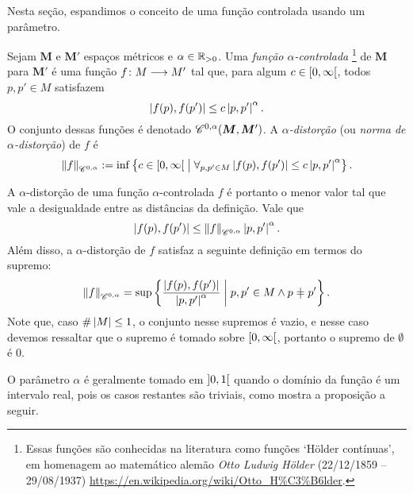 Nesta seção, espandimos o conceito de uma função controlada usando um parâmetro.

\begin{definition}
Sejam $\bm M$ e $\bm M'$ espaços métricos e $\alpha \in \mathbb{R}_{>0}$. Uma \emph{função $\alpha$-controlada}%
	\footnote{Essas funções são conhecidas na literatura como funções `Hölder contínuas', em homenagem ao matemático alemão \emph{Otto Ludwig Hölder} (22/12/1859 – 29/08/1937) \url{https://en.wikipedia.org/wiki/Otto_H\%C3\%B6lder}.} %
de $\bm M$ para $\bm M'$ é uma função ${f}\colon {M} \longrightarrow {M'}$ tal que, para algum $c \in \left[{0},{\infty}\right[$, todos $p,p' \in M$ satisfazem
	\begin{equation*}
	\left\vert{f(p)},{f(p')}\right\vert \leq c\left\vert{p},{p'}\right\vert^\alpha.
	\end{equation*}
O conjunto dessas funções é denotado $\mathscr{C}^{0,\alpha}(\bm M, \bm M')$. A \emph{$\alpha$-distorção} (ou \emph{norma de $\alpha$-distorção}) de $f$ é
	\begin{equation*}
	\left\Vert{f}\right\Vert_{\mathscr{C}^{0,\alpha}} := \inf\left\{{c \in \left[{0},{\infty}\right[}\;\middle\vert\;{\forall_{p,p' \in M} \left\vert{f(p)},{f(p')}\right\vert \leq c\left\vert{p},{p'}\right\vert^\alpha}\right\}.
	\end{equation*}
\end{definition}

A $\alpha$-distorção de uma função $\alpha$-controlada $f$ é portanto o menor valor tal que vale a desigualdade entre as distâncias da definição. Vale que
	\begin{equation*}
	\left\vert{f(p)},{f(p')}\right\vert \leq \left\Vert{f}\right\Vert_{\mathscr{C}^{0,\alpha}}\left\vert{p},{p'}\right\vert^\alpha.
	\end{equation*}
Além disso, a $\alpha$-distorção de $f$ satisfaz a seguinte definição em termos do supremo:
	\begin{equation*}
	\distor{f}_{\Cont^{0,\alpha}} = \sup \set{\frac{\dist{f(p)}{f(p')}}{\dist{p}{p'}^\alpha}}{p,p' \in M \land p \neq p'}.
	\end{equation*}
Note que, caso $\#\left\lvert{M}\right\rvert \leq 1$, o conjunto nesse supremos é vazio, e nesse caso devemos ressaltar que o supremo é tomado sobre $\left[{0},{\infty}\right[$, portanto o supremo de $\emptyset$ é $0$.




O parâmetro $\alpha$ é geralmente tomado em $\left]{0},{1}\right[$ quando o domínio da função é um intervalo real, pois os casos restantes são triviais, como mostra a proposição a seguir.

